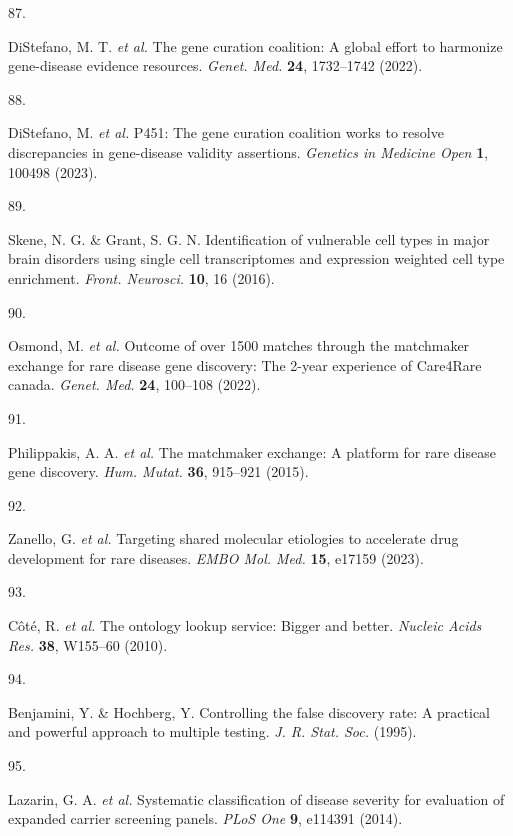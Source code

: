 \documentclass[
]{article}
\newlength{\cslhangindent}
\newlength{\csllabelwidth}
\newenvironment{CSLReferences}[2] %
 {\begin{list}{}{%
  \setlength{\itemindent}{0pt}
  \setlength{\leftmargin}{0pt}
  \setlength{\parsep}{0pt}
  \ifodd #1
   \setlength{\leftmargin}{\cslhangindent}
   \setlength{\itemindent}{-1\cslhangindent}
  \fi
  \setlength{\itemsep}{#2\baselineskip}}}
 {\end{list}}
\newcommand{\CSLLeftMargin}[1]{\parbox[t]{\csllabelwidth}{\strut#1\strut}}
\newcommand{\CSLRightInline}[1]{\parbox[t]{\linewidth - \csllabelwidth}{\strut#1\strut}}
\begin{document}
\begin{CSLReferences}{0}{0}
\CSLLeftMargin{87. }%
\CSLRightInline{DiStefano, M. T. \emph{et al.} The gene curation
coalition: A global effort to harmonize gene-disease evidence resources.
\emph{Genet. Med.} \textbf{24}, 1732--1742 (2022).}

\CSLLeftMargin{88. }%
\CSLRightInline{DiStefano, M. \emph{et al.} P451: The gene curation
coalition works to resolve discrepancies in gene-disease validity
assertions. \emph{Genetics in Medicine Open} \textbf{1}, 100498 (2023).}

\CSLLeftMargin{89. }%
\CSLRightInline{Skene, N. G. \& Grant, S. G. N. Identification of
vulnerable cell types in major brain disorders using single cell
transcriptomes and expression weighted cell type enrichment.
\emph{Front. Neurosci.} \textbf{10}, 16 (2016).}

\CSLLeftMargin{90. }%
\CSLRightInline{Osmond, M. \emph{et al.} Outcome of over 1500 matches
through the matchmaker exchange for rare disease gene discovery: The
2-year experience of {Care4Rare} canada. \emph{Genet. Med.} \textbf{24},
100--108 (2022).}

\CSLLeftMargin{91. }%
\CSLRightInline{Philippakis, A. A. \emph{et al.} The matchmaker
exchange: A platform for rare disease gene discovery. \emph{Hum. Mutat.}
\textbf{36}, 915--921 (2015).}

\CSLLeftMargin{92. }%
\CSLRightInline{Zanello, G. \emph{et al.} Targeting shared molecular
etiologies to accelerate drug development for rare diseases. \emph{EMBO
Mol. Med.} \textbf{15}, e17159 (2023).}

\CSLLeftMargin{93. }%
\CSLRightInline{Côté, R. \emph{et al.} The ontology lookup service:
Bigger and better. \emph{Nucleic Acids Res.} \textbf{38}, W155--60
(2010).}

\CSLLeftMargin{94. }%
\CSLRightInline{Benjamini, Y. \& Hochberg, Y. Controlling the false
discovery rate: A practical and powerful approach to multiple testing.
\emph{J. R. Stat. Soc.} (1995).}

\CSLLeftMargin{95. }%
\CSLRightInline{Lazarin, G. A. \emph{et al.} Systematic classification
of disease severity for evaluation of expanded carrier screening panels.
\emph{PLoS One} \textbf{9}, e114391 (2014).}

\end{CSLReferences}
\end{document}
